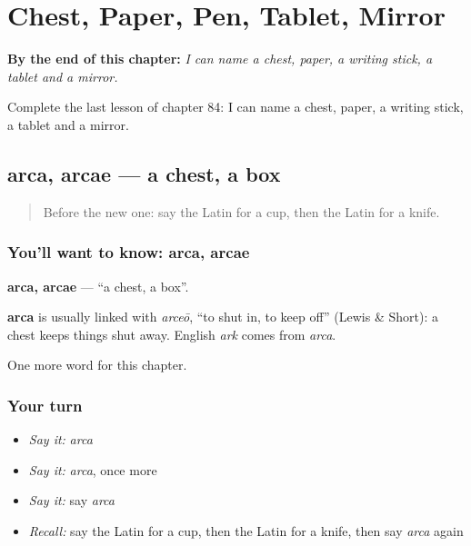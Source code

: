 
\chapter{Chest, Paper, Pen, Tablet, Mirror}
\label{ch:la-chest-paper-pen-tablet-mirror}

\begin{chapteropening}
\textbf{By the end of this chapter:} \emph{I can name a chest, paper, a writing stick, a tablet and a mirror.}

Complete the last lesson of chapter 84: I can name a chest, paper, a writing stick, a tablet and a mirror.
\end{chapteropening}

\section[arca, arcae]{arca, arcae — a chest, a box}

\label{lesson:LA-C84-arca}



\begin{quote}
Before the new one: say the Latin for a cup, then the Latin for a knife.
\end{quote}

\subsection*{You'll want to know: arca, arcae}
\textbf{arca, arcae} — \textquotedblleft{}a chest, a box\textquotedblright{}.

\begin{cousinweb}
\textbf{arca} is usually linked with \emph{arceō}, \textquotedblleft{}to shut in, to keep off\textquotedblright{} (Lewis \& Short): a chest keeps things shut away. English \emph{ark} comes from \emph{arca}.
\end{cousinweb}

\begin{grammarlens}[title={What you've built}]
One more word for this chapter.
\end{grammarlens}

\subsection*{Your turn}
\begin{itemize}
\raggedright
  \item \emph{Say it:} \emph{arca}
  \item \emph{Say it:} \emph{arca}, once more
  \item \emph{Say it:} say \emph{arca}
  \item \emph{Recall:} say the Latin for a cup, then the Latin for a knife, then say \emph{arca} again
\end{itemize}

